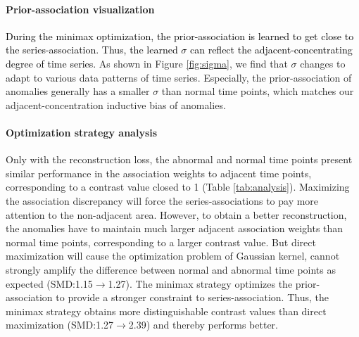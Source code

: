 \documentclass{article} %
\newcommand{\update}[1]{{\textcolor{black}{#1}}}
\begin{document}
\vspace{-5pt}
\paragraph{Prior-association visualization} \update{During the minimax optimization, the prior-association is learned to get close to the series-association. Thus, the learned $\sigma$ can reflect the adjacent-concentrating degree of time series.} As shown in Figure \ref{fig:sigma}, we find that $\sigma$ changes to adapt to various data patterns of time series. Especially, the prior-association of anomalies generally has a smaller $\sigma$ than normal time points, which matches our adjacent-concentration inductive bias of anomalies.

\vspace{-5pt}
\paragraph{Optimization strategy analysis} Only with the reconstruction loss, the abnormal and normal time points present similar performance in the association weights to adjacent time points, corresponding to a contrast value closed to 1 (Table \ref{tab:analysis}). Maximizing the association discrepancy will force the series-associations to pay more attention to the non-adjacent area. However, to obtain a better reconstruction, the anomalies have to maintain much larger adjacent association weights than normal time points, corresponding to a larger contrast value. But direct maximization will cause the optimization problem of Gaussian kernel, cannot strongly amplify the difference between normal and abnormal time points as expected (SMD:1.15$\to$1.27). The minimax strategy optimizes the prior-association to provide a stronger constraint to series-association. Thus, the minimax strategy obtains more distinguishable contrast values than direct maximization (SMD:1.27$\to$2.39) and thereby performs better.
\end{document}
